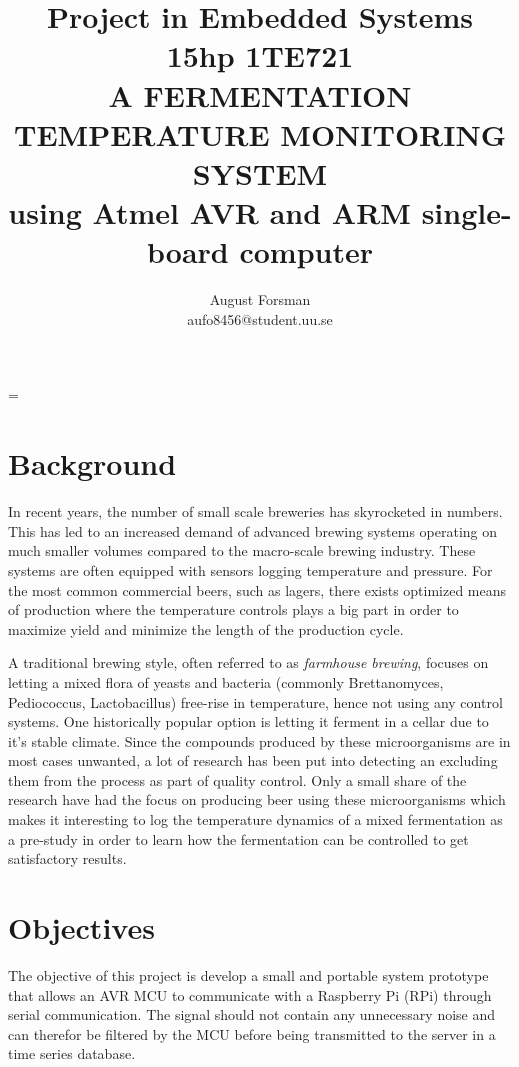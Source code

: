 \documentclass[10pt]{article}
\title{\renewcommand{\baselinestretch}{1.17}\normalsize\bf%
  Project in Embedded Systems 15hp 1TE721\\
  \vspace{2mm}
  \uppercase{A fermentation temperature monitoring system}\\
  using Atmel AVR and ARM single-board computer\\
}
\author{%
  August Forsman\\
  \small aufo8456@student.uu.se
}
\begin{document}
\date{}

\maketitle

\vspace{-0.5cm}

\baselineskip=\normalbaselineskip

\section*{Background}%
\label{sec:background}
In recent years, the number of small scale breweries has skyrocketed in numbers. This has led to an increased demand of advanced brewing systems operating on much smaller volumes compared to the macro-scale brewing industry. These systems are often equipped with sensors logging temperature and pressure. For the most common commercial beers, such as lagers, there exists optimized means of production where the temperature controls plays a big part in order to maximize yield and minimize the length of the production cycle.

A traditional brewing style, often referred to as 
\textit{farmhouse brewing}, focuses on letting a mixed flora of yeasts and bacteria (commonly Brettanomyces, Pediococcus, Lactobacillus) free-rise in temperature, hence not using any control systems. One historically popular option is letting it ferment in a cellar due to it's stable climate. Since the compounds produced by these microorganisms are in most cases unwanted, a lot of research has been put into detecting an excluding them from the process as part of quality control. Only a small share of the research have had the focus on producing beer using these microorganisms which makes it interesting to log the temperature dynamics of a mixed fermentation as a pre-study in order to learn how the fermentation can be controlled to get satisfactory results.

\section*{Objectives}%
\label{sec:objectives}
The objective of this project is develop a small and portable system prototype that allows an AVR MCU to communicate with a Raspberry Pi (RPi) through serial communication. The signal should not contain any unnecessary noise and can therefor be filtered by the MCU before being transmitted to the server in a time series database.
\end{document}
